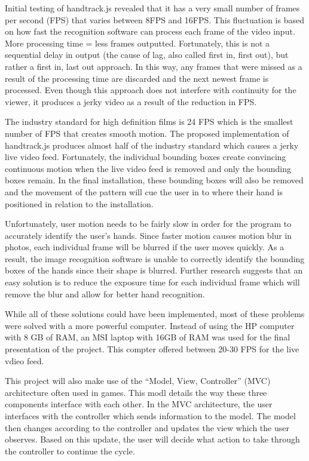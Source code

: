 \documentclass[10pt,twocolumn]{article}
\begin{document}
Initial testing of handtrack.js revealed that it has a very small number of frames per second (FPS) that varies between 8FPS and 16FPS.  This fluctuation is based on how fast the recognition software can process each frame of the video input. More processing time = less frames outputted.  Fortunately, this is not a sequential delay in output (the cause of lag, also called first in, first out), but rather a first in, last out approach.  In this way, any frames that were missed as a result of the processing time are discarded and the next newest frame is processed.  Even though this approach does not interfere with continuity for the viewer, it produces a jerky video as a result of the reduction in FPS.  

The industry standard for high definition films is 24 FPS \cite{noauthor_3_nodate} which is the smallest number of FPS that creates smooth motion.  The proposed implementation of handtrack.js produces almost half of the industry standard which causes a jerky live video feed.  Fortunately, the individual bounding boxes create convincing continuous motion when the live video feed is removed and only the bounding boxes remain. In the final installation, these bounding boxes will also be removed and the movement of the pattern will cue the user in to where their hand is positioned in relation to the installation.  

Unfortunately, user motion needs to be fairly slow in order for the program to accurately identify the user's hands.  Since faster motion causes motion blur in photos, each individual frame will be blurred if the user moves quickly. As a result, the image recognition software is unable to correctly identify the bounding boxes of the hands since their shape is blurred. Further research suggests that an easy solution is to reduce the exposure time for each individual frame which will remove the blur \cite{e_adjusting_2019} and allow for better hand recognition.   

While all of these solutions could have been implemented, most of these problems were solved with a more powerful computer.  Instead of using the HP computer with 8 GB of RAM, an MSI laptop with 16GB of RAM was used for the final presentation of the project.  This compter offered between 20-30 FPS for the live vdieo feed. 

This project will also make use of the ``Model, View, Controller'' (MVC) architecture often used in games.  This modl details the way these three components interface with each other. In the MVC architecture, the user interfaces with the controller which sends information to the model.  The model then changes according to the controller and updates the view which the user observes.  Based on this update, the user will decide what action to take through the controller to continue the cycle. 
\end{document}

